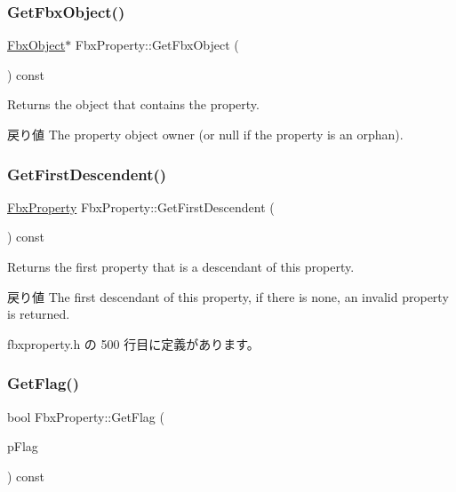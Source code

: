 \subsubsection{\texorpdfstring{Get\+Fbx\+Object()}{GetFbxObject()}}
{\footnotesize\ttfamily \hyperlink{class_fbx_object}{Fbx\+Object}$\ast$ Fbx\+Property\+::\+Get\+Fbx\+Object (\begin{DoxyParamCaption}{ }\end{DoxyParamCaption}) const}

Returns the object that contains the property. \begin{DoxyReturn}{戻り値}
The property object owner (or null if the property is an orphan). 
\end{DoxyReturn}
\mbox{\label{class_fbx_property_ad7f8dea372a3401119e18f23b03691f4}} 
\subsubsection{\texorpdfstring{Get\+First\+Descendent()}{GetFirstDescendent()}}
{\footnotesize\ttfamily \hyperlink{class_fbx_property}{Fbx\+Property} Fbx\+Property\+::\+Get\+First\+Descendent (\begin{DoxyParamCaption}{ }\end{DoxyParamCaption}) const\hspace{0.3cm}{\ttfamily [inline]}}

Returns the first property that is a descendant of this property. \begin{DoxyReturn}{戻り値}
The first descendant of this property, if there is none, an invalid property is returned. 
\end{DoxyReturn}


 fbxproperty.\+h の 500 行目に定義があります。

\mbox{\label{class_fbx_property_a08c9fefe4d1a34c091ff02386462c8d6}} 
\subsubsection{\texorpdfstring{Get\+Flag()}{GetFlag()}}
{\footnotesize\ttfamily bool Fbx\+Property\+::\+Get\+Flag (\begin{DoxyParamCaption}\item[{\hyperlink{class_fbx_property_flags_afabfa7e0949aac8a7dcdf8a141867e99}{Fbx\+Property\+Flags\+::\+E\+Flags}}]{p\+Flag }\end{DoxyParamCaption}) const}

